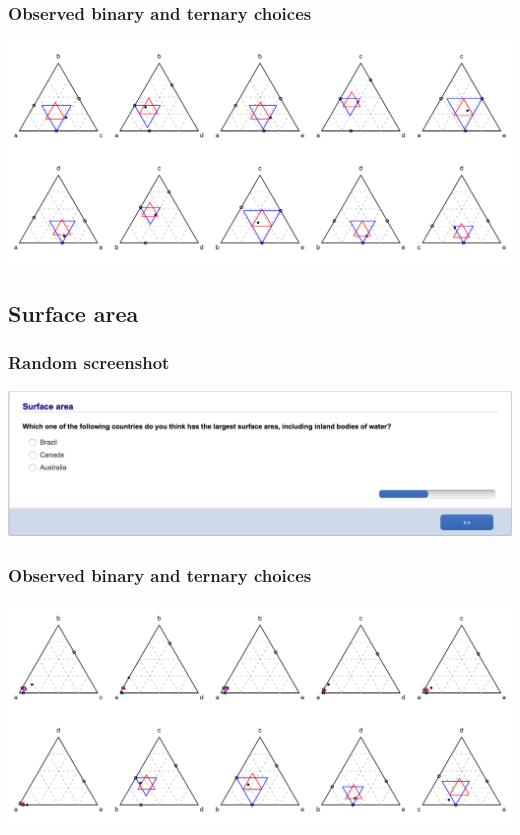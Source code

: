 \documentclass[11pt,letter]{article}
\begin{document}
\subsubsection*{Observed binary and ternary choices}

\includegraphics[width=15cm]{./Population_study_data/Simplexes/population.pdf}

\pagebreak

\subsection*{Surface area}



\subsubsection*{Random screenshot}

\includegraphics[width=15cm]{Population_study_design/screenshot_area.png}

\subsubsection*{Observed binary and ternary choices}

\includegraphics[width=15cm]{./Population_study_data/Simplexes/area.pdf}
\end{document}
